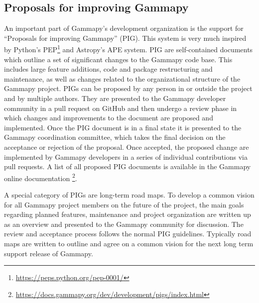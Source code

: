 \documentclass[longauth]{aa}
\newcommand{\gammapy}{Gammapy\xspace}
\newcommand{\github}{GitHub\xspace}
\begin{document}
\subsection{Proposals for improving \gammapy}
\label{ssec:pigs}
An important part of \gammapy's development organization is the support
for \enquote{Proposals for improving \gammapy} (PIG). This system is very much
inspired by Python's PEP\footnote{\url{https://peps.python.org/pep-0001/}}
and Astropy's APE \citep{greenfield_perry_2013} system.
PIG are self-contained documents which outline a set of significant
changes to the \gammapy code base. This includes large feature additions,
code and package restructuring and maintenance, as well as changes related
to the organizational structure of the \gammapy project. PIGs can be proposed
by any person in or outside the project and by multiple authors. They
are presented to the \gammapy developer community in a pull request
on \github and then undergo a review phase in which changes and
improvements to the document are proposed and implemented. Once the PIG
document is in a final state it is presented to the \gammapy
coordination committee, which takes the final decision on the
acceptance or rejection of the proposal. Once accepted, the proposed
change are implemented by \gammapy developers in a series of
individual contributions via pull requests. A list of all proposed
PIG documents is available in the \gammapy online documentation
\footnote{\url{https://docs.gammapy.org/dev/development/pigs/index.html}}.

A special category of PIGs are long-term {road maps}. To develop a common
vision for all \gammapy project members on the future of the
project, the main goals regarding planned features, maintenance and
project organization are written up as an overview and presented to the
\gammapy community for discussion. The review and acceptance process
follows the normal PIG guidelines. Typically road maps are written
to outline and agree on a common vision for the next long term
support release of \gammapy.
\end{document}
